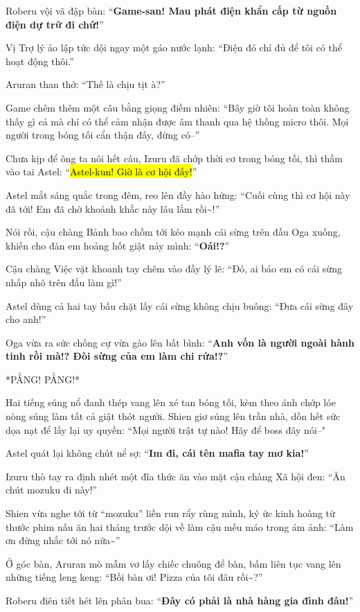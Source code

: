 \documentclass[../main.tex]{subfiles}
\begin{document}
Roberu vội vã đập bàn: ``\textbf{Game-san! Mau phát điện khẩn cấp từ nguồn điện dự trữ đi chứ!}''

Vị Trợ lý ảo lập tức dội ngay một gáo nước lạnh: ``Điện đó chỉ đủ để tôi có thể hoạt động thôi.''

Aruran than thở: ``Thế là chịu tịt à?''

Game chêm thêm một câu bằng giọng điềm nhiên: ``Bây giờ tôi hoàn toàn không thấy gì cả mà chỉ có thể cảm nhận được âm thanh qua hệ thống micro thôi. Mọi người trong bóng tối cẩn thận đấy, đừng có--''

Chưa kịp để ông ta nói hết câu, Izuru đã chớp thời cơ trong bóng tối, thì thầm vào tai Astel: ``\hl{Astel-kun! Giờ là cơ hội đấy!}''

Astel mắt sáng quắc trong đêm, reo lên đầy hào hứng: ``Cuối cùng thì cơ hội này đã tới! Em đã chờ khoảnh khắc này lâu lắm rồi\~{}!''

Nói rồi, cậu chàng Bảnh bao chồm tới kéo mạnh cái sừng trên đầu Oga xuống, khiến cho đàn em hoảng hốt giật nảy mình: ``\textbf{Oái!?}''

Cậu chàng Việc vặt khoanh tay chêm vào đầy lý lẽ: ``Đó, ai bảo em có cái sừng nhấp nhô trên đầu làm gì!''

Astel dùng cả hai tay bấu chặt lấy cái sừng không chịu buông: ``Đưa cái sừng đây cho anh!''

Oga vừa ra sức chống cự vừa gào lên bất bình: ``\textbf{Anh vốn là người ngoài hành tinh rồi mà!? Đòi sừng của em làm chi rứa!?}''

*PẰNG! PẰNG!*

Hai tiếng súng nổ đanh thép vang lên xé tan bóng tối, kèm theo ánh chớp lóe nòng súng làm tất cả giật thót người. Shien giơ súng lên trần nhà, dồn hết sức dọa nạt để lấy lại uy quyền: ``Mọi người trật tự nào! Hãy để boss đây nói--"

Astel quát lại không chút nể sợ: ``\textbf{Im đi, cái tên mafia tay mơ kia!}''

Izuru thò tay ra định nhét một đĩa thức ăn vào mặt cậu chàng Xã hội đen: ``Ăn chút mozuku đi này!''

Shien vừa nghe tới từ ``mozuku'' liền run rẩy rùng mình, ký ức kinh hoàng từ thước phim nấu ăn hai tháng trước dội về làm cậu mếu máo trong ám ảnh: ``Làm ơn đừng nhắc tới nó nữa\~{}''

Ở góc bàn, Aruran mò mẫm vơ lấy chiếc chuông để bàn, bấm liên tục vang lên những tiếng leng keng: ``Bồi bàn ơi! Pizza của tôi đâu rồi\~{}?''

Roberu điên tiết hét lên phân bua: ``\textbf{Đây có phải là nhà hàng gia đình đâu!}''
\end{document}
